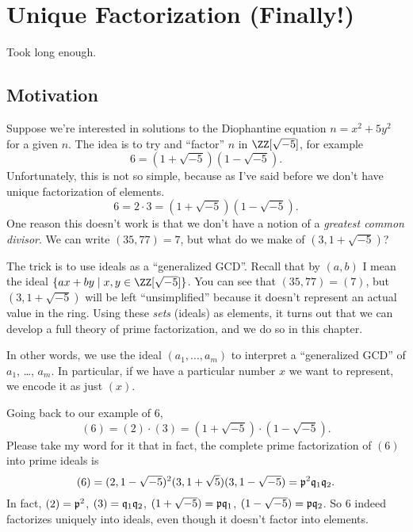 \chapter{Unique Factorization (Finally!)}
Took long enough.

\section{Motivation}
Suppose we're interested in solutions to the Diophantine equation $n = x^2 + 5y^2$ for a given $n$.
The idea is to try and ``factor'' $n$ in $\ZZ[\sqrt{-5}]$, for example \[ 6 = (1+\sqrt{-5})(1-\sqrt{-5}). \]
Unfortunately, this is not so simple, because as I've said before we don't have unique factorization of elements.
\[ 6 = 2 \cdot 3 = \left( 1+\sqrt{-5} \right)\left( 1-\sqrt{-5} \right). \]
One reason this doesn't work is that we don't have a notion of a \emph{greatest common divisor}.
We can write $(35, 77) = 7$, but what do we make of $(3, 1+\sqrt{-5})$?

The trick is to use ideals as a ``generalized GCD''.
Recall that by $(a,b)$ I mean the ideal $\{ax + by \mid x,y \in \ZZ[\sqrt{-5}] \}$.
You can see that $(35, 77) = (7)$, but $(3, 1+\sqrt{-5})$ will be left ``unsimplified'' because it doesn't
represent an actual value in the ring.
Using these \emph{sets} (ideals) as elements, it turns out that we can develop a full theory
of prime factorization, and we do so in this chapter.

In other words, we use the ideal $(a_1, \dots, a_m)$ to interpret a ``generalized GCD'' of $a_1$, \dots, $a_m$.
In particular, if we have a particular number $x$ we want to represent, we encode it as just $(x)$.

Going back to our example of $6$, \[ (6) = (2) \cdot (3) = \left( 1+\sqrt{-5} \right) \cdot \left( 1-\sqrt{-5} \right). \]
Please take my word for it that in fact, the complete prime factorization of $(6)$ into prime ideals is
\[
	(6)
	= (2,1-\sqrt{-5})^2 (3,1+\sqrt{5})(3,1-\sqrt{-5})
	= \mathfrak p^2 \mathfrak q_1 \mathfrak q_2. \]
In fact, $(2) = \mathfrak p^2$, $(3) = \mathfrak q_1 \mathfrak q_2$,
$(1+\sqrt{-5}) = \mathfrak p \mathfrak q_1$, $(1-\sqrt{-5}) = \mathfrak p \mathfrak q_2$.
So $6$ indeed factorizes uniquely into ideals, even though it doesn't factor into elements.

